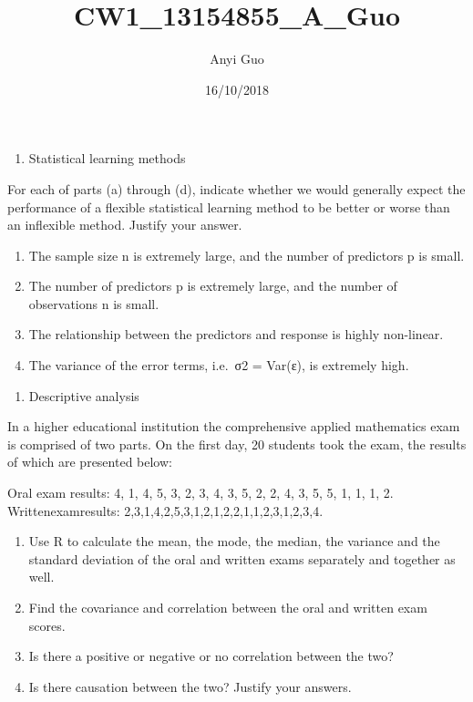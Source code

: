 \documentclass[]{article}
\title{CW1\_13154855\_A\_Guo}
\author{Anyi Guo}
\date{16/10/2018}
\providecommand{\tightlist}{%
  \setlength{\itemsep}{0pt}\setlength{\parskip}{0pt}}
\begin{document}
\maketitle

\begin{enumerate}
\def\labelenumi{\arabic{enumi}.}
\tightlist
\item
  Statistical learning methods
\end{enumerate}

For each of parts (a) through (d), indicate whether we would generally
expect the performance of a flexible statistical learning method to be
better or worse than an inflexible method. Justify your answer.

\begin{enumerate}
\def\labelenumi{(\alph{enumi})}
\tightlist
\item
  The sample size n is extremely large, and the number of predictors p
  is small.\\
\item
  The number of predictors p is extremely large, and the number of
  observations n is small.\\
\item
  The relationship between the predictors and response is highly
  non-linear.\\
\item
  The variance of the error terms, i.e.~σ2 = Var(ε), is extremely high.
\end{enumerate}

\begin{enumerate}
\def\labelenumi{\arabic{enumi}.}
\setcounter{enumi}{1}
\tightlist
\item
  Descriptive analysis
\end{enumerate}

In a higher educational institution the comprehensive applied
mathematics exam is comprised of two parts. On the first day, 20
students took the exam, the results of which are presented below:

Oral exam results: 4, 1, 4, 5, 3, 2, 3, 4, 3, 5, 2, 2, 4, 3, 5, 5, 1, 1,
1, 2. Writtenexamresults: 2,3,1,4,2,5,3,1,2,1,2,2,1,1,2,3,1,2,3,4.

\begin{enumerate}
\def\labelenumi{(\alph{enumi})}
\tightlist
\item
  Use R to calculate the mean, the mode, the median, the variance and
  the standard deviation of the oral and written exams separately and
  together as well.\\
\item
  Find the covariance and correlation between the oral and written exam
  scores.\\
\item
  Is there a positive or negative or no correlation between the two?\\
\item
  Is there causation between the two? Justify your answers.\\
\end{enumerate}
\end{document}
